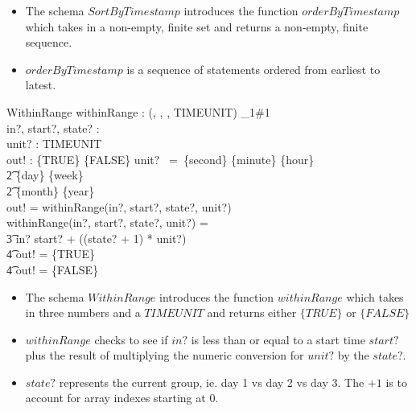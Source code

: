 \documentclass{article}
\begin{document}
\begin{itemize}
\item The schema $SortByTimestamp$ introduces the function
  $orderByTimestamp$ which takes in a non-empty, finite set and
  returns a non-empty, finite sequence.
\item $orderByTimestamp$ is a sequence of statements ordered from
  earliest to latest.
\end{itemize}

\begin{schema}{WithinRange}
  withinRange : (\nat, \nat, \nat, TIMEUNIT) \fun \finset_1\#1 \\
  in?, start?, state? : \nat \\
  unit? : TIMEUNIT \\
  out! : \{TRUE\} \lor \{FALSE\}
  \where
  unit? \, = \,\{second\}  \lor \{minute\} 
  \lor \{hour\}  \,\lor \\\t2 \{day\}  \lor
  \{week\}  \,\lor \\\t2 \{month\} 
  \lor \{year\}  \\

  out! = withinRange(in?, start?, state?, unit?) \\
  withinRange(in?, start?, state?, unit?) = \\\t3 \IF in? \leq
  start? + ((state? + 1) * unit?) \\\t4 \THEN out! = \{TRUE\} \\\t4 \ELSE
  out! = \{FALSE\} \\
\end{schema}

\begin{itemize}
\item The schema $WithinRange$ introduces the function $withinRange$
  which takes in three numbers and a $TIMEUNIT$ and returns either
  $\{TRUE\}$ or $\{FALSE\}$
\item $withinRange$ checks to see if $in?$ is less than or equal to a
  start time $start?$ plus the result of multiplying the numeric
  conversion for $unit?$ by the $state?$.
\item $state?$ represents the current group, ie. day 1 vs day 2 vs day
  3. The $+ 1$ is to account for array indexes starting at 0.
\end{itemize}
\end{document}
